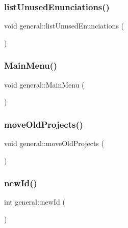 \mbox{\label{classgeneral_a0a6fecb5fd726b346db53c3210cc8de6}} 
\subsubsection{\texorpdfstring{list\+Unused\+Enunciations()}{listUnusedEnunciations()}}
{\footnotesize\ttfamily void general\+::list\+Unused\+Enunciations (\begin{DoxyParamCaption}{ }\end{DoxyParamCaption})}

\mbox{\label{classgeneral_ae11e9494ad52be040c2142bcfcb0c941}} 
\subsubsection{\texorpdfstring{Main\+Menu()}{MainMenu()}}
{\footnotesize\ttfamily void general\+::\+Main\+Menu (\begin{DoxyParamCaption}{ }\end{DoxyParamCaption})}

\mbox{\label{classgeneral_a75f3d042e36e0d2006e543cc1be50e99}} 
\subsubsection{\texorpdfstring{move\+Old\+Projects()}{moveOldProjects()}}
{\footnotesize\ttfamily void general\+::move\+Old\+Projects (\begin{DoxyParamCaption}{ }\end{DoxyParamCaption})}

\mbox{\label{classgeneral_a54a8942cc87fc31ddc7b43fb377e99bf}} 
\subsubsection{\texorpdfstring{new\+Id()}{newId()}}
{\footnotesize\ttfamily int general\+::new\+Id (\begin{DoxyParamCaption}{ }\end{DoxyParamCaption})}

